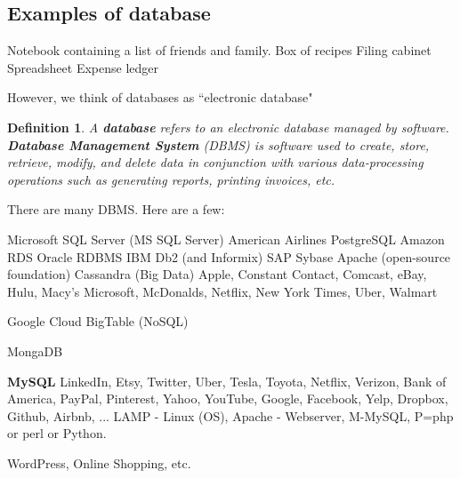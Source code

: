 \documentclass{article}
\newtheorem{definition}{Definition}
\begin{document}
\subsection*{Examples of database}

 \begin{outline}
        \1 Notebook containing a list of friends and family.
        \1 Box of recipes
        \1 Filing cabinet
        \1 Spreadsheet
        \1 Expense ledger
\end{outline}
However, we think of databases as ``electronic database"



\newpage

\begin{definition}
        A \textbf{database} refers to an electronic database managed by software.  \textbf{Database Management System} (DBMS) is software used to create, store, retrieve, modify, and delete data in conjunction with various data-processing operations such as generating reports, printing invoices, etc.  
\end{definition}


There are many DBMS.  Here are a few:
\begin{outline}
        \1 Microsoft SQL Server (MS SQL Server)
                \2 American Airlines
        \1 PostgreSQL
        \1 Amazon RDS
        \1 Oracle RDBMS
        \1 IBM Db2 (and Informix)
        \1 SAP Sybase
        \1 Apache (open-source foundation) Cassandra (Big Data)
                \2 Apple, Constant Contact, Comcast, eBay, Hulu, Macy's Microsoft, McDonalds, Netflix, New York Times, Uber, Walmart

        \1 Google Cloud BigTable (NoSQL)
        
        \1 MongaDB
        
        \1 \textbf{MySQL} 
                \2 LinkedIn, Etsy, Twitter, Uber, Tesla, Toyota, Netflix, Verizon, Bank of America, PayPal, Pinterest, Yahoo, YouTube, Google, Facebook, Yelp, Dropbox, Github, Airbnb, ...
        \2 LAMP  - Linux (OS), Apache - Webserver, M-MySQL, P=php or perl or Python.  

        \2 WordPress, Online Shopping, etc.  
                
\end{outline}
\end{document}
